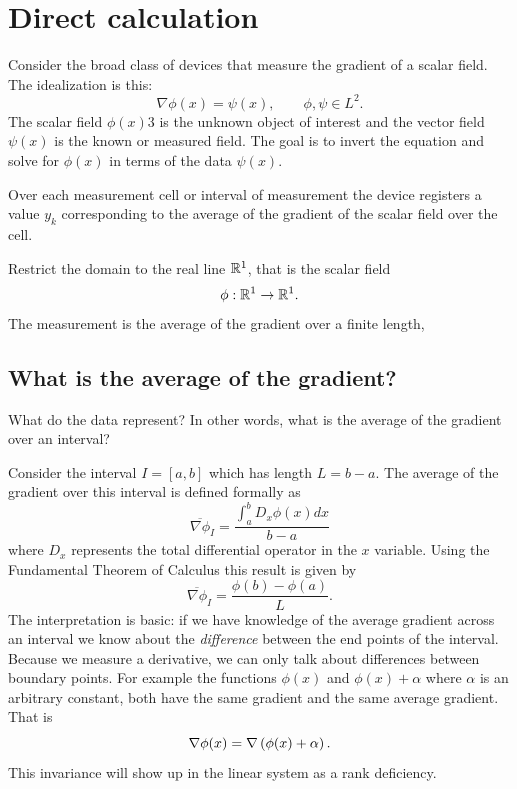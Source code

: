 \section{Direct calculation}

Consider the broad class of devices that measure the gradient of a scalar field. The idealization is this:
\begin{equation}
  \nabla \phi(x) = \psi(x), \qquad \phi, \psi \in L^{2}.
\end{equation}
The scalar field $\phi(x)3$ is the unknown object of interest and the vector field $\psi(x)$ is the known or measured field. The goal is to invert the equation and solve for $\phi(x)$ in terms of the data $\psi(x)$.

Over each measurement cell or interval of measurement the device registers a value $y_{k}$ corresponding to the average of the gradient of the scalar field over the cell.

Restrict the domain to the real line $\mathbb{R}^{1}$, that is the scalar field
\begin{equation}
  \phi: \mathbb{R}^{1}\to\mathbb{R}^{1}.
\end{equation}
The measurement is the average of the gradient over a finite length,

\subsection[The average of the gradient]{What is the average of the gradient?}
What do the data represent? In other words, what is the average of the gradient over an interval?

Consider the interval $I=[a,b]$ which has length $L=b-a$. The average of the gradient over this interval is defined formally as
\begin{equation}
  \overline{\nabla \phi}_{I} = \frac{\int_{a}^{b}{D_{x}\phi(x)dx}}{b-a}
\end{equation}
where $D_{x}$ represents the total differential operator in the $x$ variable. Using the Fundamental Theorem of Calculus this result is given by
\begin{equation}
  \overline{\nabla \phi}_{I} = \frac{\phi(b)-\phi(a)}{L}.
\end{equation}
The interpretation is basic: if we have knowledge of the average gradient across an interval we know about the \textit{difference} between the end points of the interval. Because we measure a derivative, we can only talk about differences between boundary points. For example the functions $\phi(x)$ and $\phi(x)+\alpha$ where $\alpha$ is an arbitrary constant, both have the same gradient and the same average gradient. That is
\begin{equation}
  \nabla \phi(x) = \nabla \left( \phi(x)+\alpha \right).
  \label{eq:gradient:invariance}
\end{equation}
This invariance will show up in the linear system as a rank deficiency.

